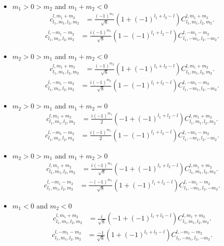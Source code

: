 \documentclass[onecolumn,11pt]{IEEEtran}
\begin{document}
\begin{itemize}
    \item $m_1 > 0 > m_2 $ and $m_1+m_2 < 0$
        \begin{align*}
            c^{l,m_1+m_2}_{l_1,m_1,l_2,m_2} & = \frac{(-1)^{m_1}}{\sqrt{8}} ( 1 + (-1)^{l_1+l_2-l}) C^{l,m_1+m_2}_{l_1,m_1,l_2,m_2}.
        \end{align*}
        \begin{align*}
            c^{l,-m_1-m_2}_{l_1,m_1,l_2,m_2} & = \frac{i(-1)^{m_1}}{\sqrt{8}} ( 1 - (-1)^{l_1+l_2-l}) C^{l,-m_1-m_2}_{l_1,-m_1,l_2,-m_2}.
        \end{align*}

    \item $m_2 > 0 > m_1 $ and $m_1+m_2 < 0$
        \begin{align*}
            c^{l,m_1+m_2}_{l_1,m_1,l_2,m_2} & = \frac{(-1)^{m_2}}{\sqrt{8}} ( 1 + (-1)^{l_1+l_2-l}) C^{l,m_1+m_2}_{l_1,m_1,l_2,m_2}.
        \end{align*}
        \begin{align*}
            c^{l,-m_1-m_2}_{l_1,m_1,l_2,m_2} & = \frac{i(-1)^{m_2}}{\sqrt{8}} ( 1 - (-1)^{l_1+l_2-l}) C^{l,-m_1-m_2}_{l_1,-m_1,l_2,-m_2}.
        \end{align*}

    \item $m_2 > 0 > m_1 $ and $m_1+m_2 = 0$
        \begin{align*}
            c^{l,m_1+m_2}_{l_1,m_1,l_2,m_2} & = \frac{i(-1)^{m_1}}{2} ( -1 + (-1)^{l_1+l_2-l}) C^{l,m_1+m_2}_{l_1,m_1,l_2,m_2}.
        \end{align*}
        \begin{align*}
            c^{l,-m_1-m_2}_{l_1,m_1,l_2,m_2} & = \frac{i(-1)^{m_1}}{2} ( 1 - (-1)^{l_1+l_2-l}) C^{l,-m_1-m_2}_{l_1,-m_1,l_2,-m_2}.
        \end{align*}

    \item $m_2 > 0 > m_1 $ and $m_1+m_2 > 0$
        \begin{align*}
            c^{l,m_1+m_2}_{l_1,m_1,l_2,m_2} & = \frac{i(-1)^{m_1}}{\sqrt{8}} ( -1 + (-1)^{l_1+l_2-l}) C^{l,m_1+m_2}_{l_1,m_1,l_2,m_2}.
        \end{align*}
        \begin{align*}
            c^{l,-m_1-m_2}_{l_1,m_1,l_2,m_2} & = \frac{-(-1)^{m_1}}{\sqrt{8}} ( 1 + (-1)^{l_1+l_2-l}) C^{l,-m_1-m_2}_{l_1,-m_1,l_2,-m_2}.
        \end{align*}

    \item $m_1 < 0$ and $m_2 < 0$
        \begin{align*}
            c^{l,m_1+m_2}_{l_1,m_1,l_2,m_2} & = \frac{i}{\sqrt{8}} ( -1 + (-1)^{l_1+l_2-l}) C^{l,m_1+m_2}_{l_1,m_1,l_2,m_2}.
        \end{align*}
        \begin{align*}
            c^{l,-m_1-m_2}_{l_1,m_1,l_2,m_2} & = \frac{-1}{\sqrt{8}} ( 1 + (-1)^{l_1+l_2-l}) C^{l,-m_1-m_2}_{l_1,-m_1,l_2,-m_2}.
        \end{align*}


\end{itemize}
\end{document}
